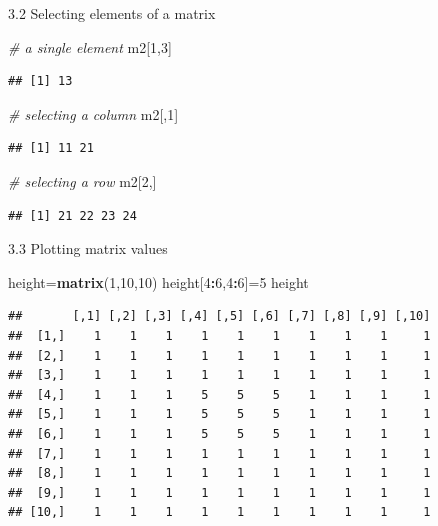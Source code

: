 \documentclass[
  ignorenonframetext,
]{beamer}
\newenvironment{Shaded}{\begin{snugshade}}{\end{snugshade}}
\newcommand{\CommentTok}[1]{\textcolor[rgb]{0.56,0.35,0.01}{\textit{#1}}}
\newcommand{\DecValTok}[1]{\textcolor[rgb]{0.00,0.00,0.81}{#1}}
\newcommand{\FunctionTok}[1]{\textcolor[rgb]{0.13,0.29,0.53}{\textbf{#1}}}
\newcommand{\NormalTok}[1]{#1}
\newcommand{\OtherTok}[1]{\textcolor[rgb]{0.56,0.35,0.01}{#1}}
\newcommand{\SpecialCharTok}[1]{\textcolor[rgb]{0.81,0.36,0.00}{\textbf{#1}}}
\begin{document}
\begin{frame}[fragile]{3.2 Selecting elements of a matrix}
\protect\hypertarget{selecting-elements-of-a-matrix}{}
\begin{Shaded}
\begin{Highlighting}[]
\CommentTok{\# a single element}
\NormalTok{m2[}\DecValTok{1}\NormalTok{,}\DecValTok{3}\NormalTok{]}
\end{Highlighting}
\end{Shaded}

\begin{verbatim}
## [1] 13
\end{verbatim}

\begin{Shaded}
\begin{Highlighting}[]
\CommentTok{\# selecting a column }
\NormalTok{m2[,}\DecValTok{1}\NormalTok{]}
\end{Highlighting}
\end{Shaded}

\begin{verbatim}
## [1] 11 21
\end{verbatim}

\begin{Shaded}
\begin{Highlighting}[]
\CommentTok{\# selecting a row}
\NormalTok{m2[}\DecValTok{2}\NormalTok{,]}
\end{Highlighting}
\end{Shaded}

\begin{verbatim}
## [1] 21 22 23 24
\end{verbatim}
\end{frame}

\begin{frame}[fragile]{3.3 Plotting matrix values}
\protect\hypertarget{plotting-matrix-values}{}
\begin{Shaded}
\begin{Highlighting}[]
\NormalTok{height}\OtherTok{=}\FunctionTok{matrix}\NormalTok{(}\DecValTok{1}\NormalTok{,}\DecValTok{10}\NormalTok{,}\DecValTok{10}\NormalTok{)}
\NormalTok{height[}\DecValTok{4}\SpecialCharTok{:}\DecValTok{6}\NormalTok{,}\DecValTok{4}\SpecialCharTok{:}\DecValTok{6}\NormalTok{]}\OtherTok{=}\DecValTok{5}
\NormalTok{height}
\end{Highlighting}
\end{Shaded}

\begin{verbatim}
##       [,1] [,2] [,3] [,4] [,5] [,6] [,7] [,8] [,9] [,10]
##  [1,]    1    1    1    1    1    1    1    1    1     1
##  [2,]    1    1    1    1    1    1    1    1    1     1
##  [3,]    1    1    1    1    1    1    1    1    1     1
##  [4,]    1    1    1    5    5    5    1    1    1     1
##  [5,]    1    1    1    5    5    5    1    1    1     1
##  [6,]    1    1    1    5    5    5    1    1    1     1
##  [7,]    1    1    1    1    1    1    1    1    1     1
##  [8,]    1    1    1    1    1    1    1    1    1     1
##  [9,]    1    1    1    1    1    1    1    1    1     1
## [10,]    1    1    1    1    1    1    1    1    1     1
\end{verbatim}
\end{frame}
\end{document}
